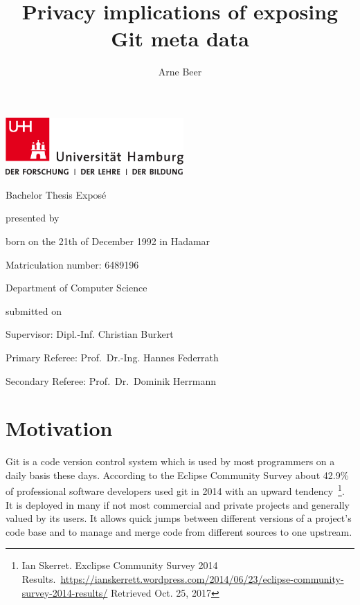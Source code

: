 \documentclass[
  twoside,
  11pt, a4paper,
  footinclude=true,
  headinclude=true,
  cleardoublepage=empty
]{scrreprt}
\title{Privacy implications of exposing Git meta data}
\author{Arne Beer}
\begin{document}
\thispagestyle{empty}

\begin{titlepage}
    \includegraphics[width=6.8cm]{./pic/up-uhh-logo-u-2010-u-farbe-u-rgb.pdf}
    \begin{center}\Large
        \vfill
        Bachelor Thesis Exposé
        \vfill

        \makeatletter
        {\Large\textsf{\textbf{\@title}}\par}
        \makeatother

        \vfill
        presented by
        \par\bigskip

        \makeatletter
        {\@author} \par
        \makeatother

        born on the 21th of December 1992 in Hadamar \par
        Matriculation number: 6489196 \par
        Department of Computer Science
        \vfill

        \makeatletter
        submitted on {\@date}
        \makeatother

        \vfill
        Supervisor: Dipl.-Inf. Christian Burkert \par
        Primary Referee: Prof.\ Dr.-Ing. Hannes Federrath \par
        Secondary Referee:  Prof.\ Dr.\ Dominik Herrmann

    \end{center}
\end{titlepage}

{\small \tableofcontents}

\chapter{Motivation}
Git is a code version control system which is used by most programmers on a daily basis these days. According to the Eclipse Community Survey about 42.9\% of professional software developers used git in 2014 with an upward tendency~\footnote{Ian Skerret. Exclipse Community Survey 2014 Results.\ \url{https://ianskerrett.wordpress.com/2014/06/23/eclipse-community-survey-2014-results/} Retrieved Oct. 25, 2017}.
It is deployed in many if not most commercial and private projects and generally valued by its users. It allows quick jumps between different versions of a project's code base and to manage and merge code from different sources to one upstream.
\end{document}
